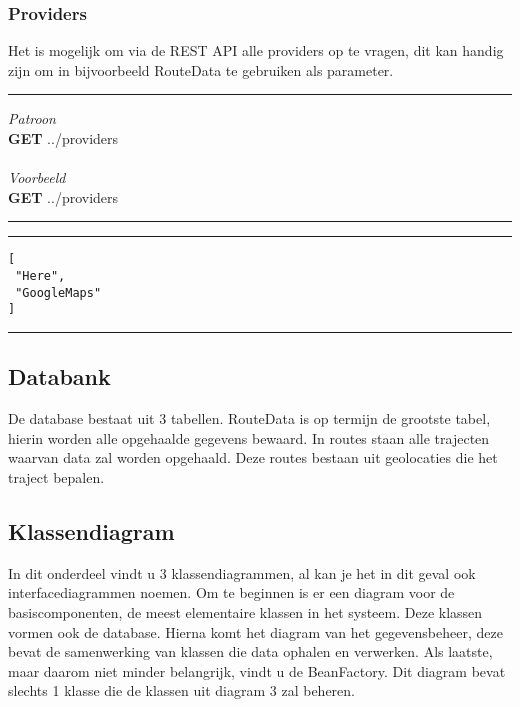 \documentclass[ps,a4paper,oneside]{report}
\begin{document}
\subsubsection{Providers}
Het is mogelijk om via de REST API alle providers op te vragen, dit kan handig zijn om in bijvoorbeeld RouteData te gebruiken als parameter.\\
\noindent\rule[0.5ex]{\linewidth}{1pt}
\textit{Patroon}\\
\textbf{GET} ../providers\\\\
\textit{Voorbeeld}\\
\textbf{GET} ../providers\\
\noindent\rule[0.5ex]{\linewidth}{1pt}
\noindent\rule[0.5ex]{\linewidth}{1pt}
\begin{verbatim}
[
 "Here",
 "GoogleMaps"
]
\end{verbatim}
\noindent\rule[0.5ex]{\linewidth}{1pt}
\subsection{Databank}
De database bestaat uit 3 tabellen. RouteData is op termijn de grootste tabel, hierin worden alle opgehaalde gegevens bewaard. In routes staan alle trajecten waarvan data zal worden opgehaald. Deze routes bestaan uit geolocaties die het traject bepalen.
\subsection{Klassendiagram}
In dit onderdeel vindt u 3 klassendiagrammen, al kan je het in dit geval ook interfacediagrammen noemen. Om te beginnen is er een diagram voor de basiscomponenten, de meest elementaire klassen in het systeem. Deze klassen vormen ook de database. Hierna komt het diagram van het gegevensbeheer, deze bevat de samenwerking van klassen die data ophalen en verwerken. Als laatste, maar daarom niet minder belangrijk, vindt u de BeanFactory. Dit diagram bevat slechts 1 klasse die de klassen uit diagram 3 zal beheren.
\end{document}
